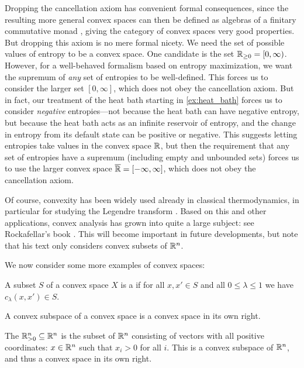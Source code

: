 \documentclass[12pt, reqno]{amsart}
\newcommand{\pos}{\real_{> 0}}
\newcommand{\nonneg}{\real_{\geq 0}}
\newcommand{\extreal}{\overline{\real}}
\begin{document}
Dropping the cancellation axiom has convenient formal consequences, since the resulting more general convex spaces can then be defined as algebras of a finitary commutative monad \cite{Jacobs,Swirszcz}, giving the category of convex spaces very good properties. But dropping this axiom is no mere formal nicety. We need the set of possible values of entropy to be a convex space. One candidate is the set $\nonneg = [0,\infty)$. However, for a well-behaved formalism based on entropy maximization, we want the supremum of \emph{any} set of entropies to be well-defined. This forces us to consider the larger set $[0,\infty]$, which does not obey the cancellation axiom. But in fact, our treatment of the heat bath starting in \cref{ex:heat_bath} forces us to consider \emph{negative} entropies---not because the heat bath can have negative entropy, but because the heat bath acts as an infinite reservoir of entropy, and the change in entropy from its default state can be positive or negative. This suggests letting entropies take values in the convex space $\mathbb{R}$, but then the requirement that any set of entropies have a supremum (including empty and unbounded sets) forces us to use the larger convex space $\extreal = [-\infty,\infty]$, which does not obey the cancellation axiom.

Of course, convexity has been widely used already in classical thermodynamics, in particular for studying the Legendre transform \cite{GaglianiScotti, PointErlicher, Willerton}. Based on this and other applications, convex analysis has grown into quite a large subject: see Rockafellar's book \cite{Rockafellar}. This will become important in future developments, but note that his text only considers convex subsets of $\mathbb{R}^n$. 

We now consider some more examples of convex spaces:

\begin{definition}
    A subset $S$ of a convex space $X$ is a  if for all $x, x' \in S$ and all $0 \le \lambda \le 1$ we have $c_\lambda(x,x') \in S$.
\end{definition}

A convex subspace of a convex space is a convex space in its own right. 

\begin{example}
    The  $\pos^n \ins \real^n$ is the subset of $\mathbb{R}^n$ consisting of vectors with all positive coordinates: $x \in \mathbb{R}^n$ such that $x_i > 0$ for all $i$. This is a convex subspace of $\mathbb{R}^n$, and thus a convex space in its own right.
\end{example}
\end{document}

